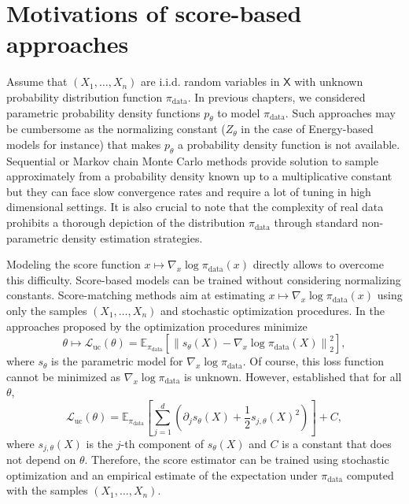 \documentclass[english,graybox,envcountchap,envcountsame,sectrefs,shortlabels]{svmono}
\theoremstyle{style}
\newcommand{\eqsp}{}
\begin{document}
\section{Motivations of score-based approaches}
Assume that $(X_1,\ldots,X_n)$ are i.i.d. random variables in $\mathsf{X}$ with unknown probability distribution function $\pi_{\mathrm{data}}$. In previous chapters, we considered parametric probability density functions  $p_\theta$ to model $\pi_{\mathrm{data}}$.  Such approaches may be cumbersome as the normalizing constant ($Z_\theta$ in the case of Energy-based models for instance) that makes $p_\theta$ a probability density function is not available. Sequential or Markov chain Monte Carlo methods provide solution to sample approximately from a probability density known up to a multiplicative constant but they can face slow convergence rates and require a lot of tuning in high dimensional settings. It is also crucial to note that the complexity of real data prohibits a thorough depiction of the distribution $\pi_{\mathrm{data}}$ through standard non-parametric density estimation strategies. 

Modeling the score function $x\mapsto\nabla_x\log\pi_{\mathrm{data}}(x) $ directly allows to overcome this difficulty. Score-based models can be trained  without considering  normalizing constants. Score-matching methods aim at estimating $x\mapsto\nabla_x\log\pi_{\mathrm{data}}(x) $ using only the samples $(X_1,\ldots,X_n)$ and stochastic optimization procedures. In the approaches proposed by \cite{hyvarinen2005estimation,vincent2011connection} the optimization procedures minimize $$
\theta\mapsto \mathcal{L}_{\mathrm{uc}}(\theta) = \mathbb{E}_{\pi_{\mathrm{data}}}\left[\left\|s_\theta(X) - \nabla_x\log\pi_{\mathrm{data}}(X)\right\|_2^2\right]\eqsp,
$$
where $s_\theta$ is the parametric model for $\nabla_x\log\pi_{\mathrm{data}}$. Of course, this loss function cannot be minimized as $ \nabla_x\log\pi_{\mathrm{data}}$ is unknown. However, \cite[Theorem~1]{hyvarinen2005estimation} established that for all $\theta$,
$$
\mathcal{L}_{\mathrm{uc}}(\theta) = \mathbb{E}_{\pi_{\mathrm{data}}}\left[\sum_{j=1}^d\left(\partial_j s_\theta(X) + \frac{1}{2}s_{j,\theta}(X)^2\right)\right] + C\eqsp,
$$
where $s_{j,\theta}(X)$ is the $j$-th component of $s_{\theta}(X)$ and $C$ is a constant that does not depend on $\theta$. Therefore, the score estimator can be trained using stochastic optimization and an empirical estimate of the expectation under $\pi_{\mathrm{data}}$ computed with the samples $(X_1,\ldots,X_n)$.
\end{document}
